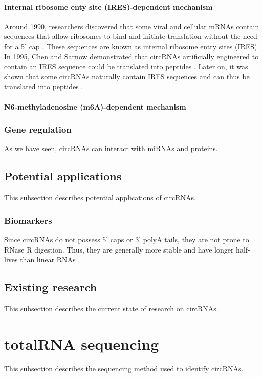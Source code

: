 \paragraph{Internal ribosome enty site (IRES)-dependent mechanism}
Around 1990, researchers discovered that some viral and cellular mRNAs contain
sequences that allow ribosomes to bind and initiate translation without the need
for a 5' cap \supercite{pelletier_internal_1988, jang_segment_1988}.
These sequences are known as internal ribosome entry sites (IRES).
In 1995, Chen and Sarnow demonstrated that circRNAs artificially
engineered to contain an IRES sequence could be translated into peptides
\supercite{chen_initiation_1995}. Later on, it was shown that some circRNAs
naturally contain IRES sequences and can thus be translated into peptides
\supercite{chen_expanding_2020,legnini_circ-znf609_2017,pamudurti_translation_2017}.

\paragraph{N6-methyladenosine (m6A)-dependent mechanism}


\subsubsection{Gene regulation}
As we have seen, circRNAs can interact with miRNAs and proteins.

\subsection{Potential applications}
This subsection describes potential applications of circRNAs.

\subsubsection{Biomarkers}
Since circRNAs do not possess 5' caps or 3' polyA tails, they are not prone to
RNase R digestion. Thus, they are generally more stable and have longer
half-lives than linear RNAs \supercite{kristensen_biogenesis_2019}.

\subsection{Existing research}
This subsection describes the current state of research on circRNAs.

\section{totalRNA sequencing}
This subsection describes the sequencing method used to identify circRNAs.

